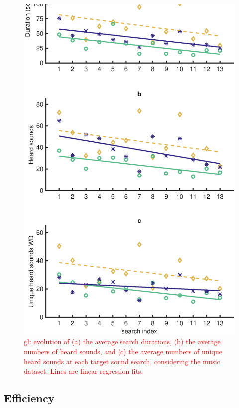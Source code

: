 \documentclass{aes2e}
\newcommand{\gl}[1]{\textcolor{red}{gl: #1}}
\begin{document}
\begin{figure}[t]
\begin{center}
\includegraphics[width=\columnwidth]{gfx/analyse_music2.eps} 
\end{center}
\caption{\label{fig2Music} \gl{evolution of (a) the average search durations, (b) the average numbers of heard sounds, and (c) the average numbers of unique heard sounds at each target sound search, considering the music dataset. Lines are linear regression fits.}}
\end{figure}

\subsection{Efficiency}
\end{document}
